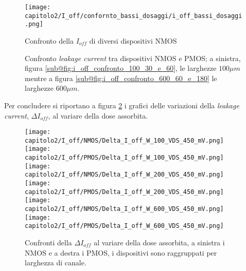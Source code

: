 \begin{figure}[h]

    \centering
    
    \texttt{[image: capitolo2/I\_off/confornto\_bassi\_dosaggi/i\_off\_bassi\_dosaggi.png]}
    \caption[Confronto della $I_{off}$ di diversi dispositivi NMOS]{Confronto della $I_{off}$ di diversi dispositivi NMOS}
    \label{fig:i_off_confronto_bassi_dosaggi}
    
    \vspace{1cm}
    
    \centering

    \caption[Confronto \textit{leakage current} tra dispositivi NMOS e PMOS]{Confronto \textit{leakage current} tra dispositivi NMOS e PMOS; a sinistra, figura \ref{sub@fig:i_off_confronto_100_30_e_60}, le larghezze $100\mu m$ mentre a figura \ref{sub@fig:i_off_confronto_600_60_e_180} le larghezze $600\mu m$.}
    \label{fig:i_off_confronto}
    

\end{figure}

\vspace{0.5cm}
Per concludere si riportano a figura \ref{fig:delta_i_off} i grafici delle variazioni della \textit{leakage current}, $\Delta I_{off}$, al variare della dose assorbita.

\clearpage

\begin{figure}[ht]
    
    \texttt{[image: capitolo2/I\_off/NMOS/Delta\_I\_off\_W\_100\_VDS\_450\_mV.png]}
    \texttt{[image: capitolo2/I\_off/PMOS/Delta\_I\_off\_W\_100\_VDS\_450\_mV.png]}\\
    \vspace{0.2cm}
    \texttt{[image: capitolo2/I\_off/NMOS/Delta\_I\_off\_W\_200\_VDS\_450\_mV.png]}
    \texttt{[image: capitolo2/I\_off/PMOS/Delta\_I\_off\_W\_200\_VDS\_450\_mV.png]}\\
    \vspace{0.2cm}
    \texttt{[image: capitolo2/I\_off/NMOS/Delta\_I\_off\_W\_600\_VDS\_450\_mV.png]}
    \texttt{[image: capitolo2/I\_off/PMOS/Delta\_I\_off\_W\_600\_VDS\_450\_mV.png]}
    
    \caption[$\Delta I_{off}$ al variare della dose assorbita, NMOS e PMOS]{Confronti della $\Delta I_{off}$ al variare della dose assorbita, a sinistra i NMOS e a destra i PMOS, i dispositivi sono raggruppati per larghezza di canale.}
    \label{fig:delta_i_off}
\end{figure}

\FloatBarrier